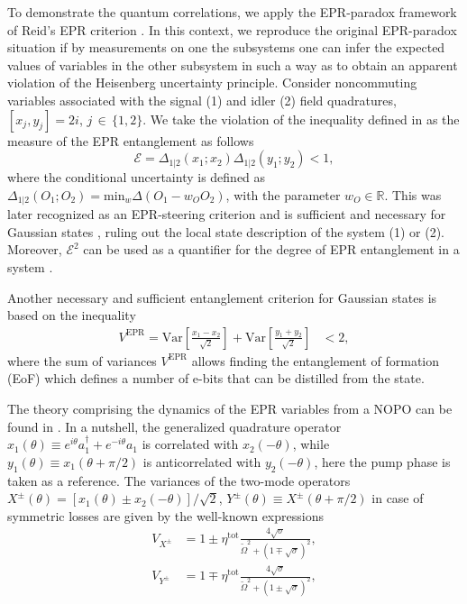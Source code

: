 \documentclass[final,twocolumn,english,prl,notitlepage,nofootinbib,floatfix,longbibliography,superscriptaddress
]{revtex4-2}
\begin{document}
To demonstrate the quantum correlations, we apply the EPR-paradox framework \cite{Einstein1935,Reid2009} of Reid's EPR criterion \cite{Reid1989}. In this context, we reproduce the original EPR-paradox situation if by measurements on one the subsystems one can infer the expected values of variables in the other subsystem in such a way as to obtain an apparent violation of the Heisenberg uncertainty principle. Consider noncommuting variables associated with the signal (1) and idler (2) field quadratures, $[x_j,y_j]=2i$, $j\,\in\, \{1,2\}$.  We take the violation of the inequality defined in \cite{Reid1989,Cavalcanti2009} as the measure of the EPR entanglement as follows
\begin{equation}
\label{eq1}
    \mathcal{E}=\Delta_{1|2}(x_1;x_2)\Delta_{1|2}(y_1;y_2) < 1,
\end{equation}
where the conditional uncertainty is defined as $\Delta_{1|2}(O_1;O_2)=\mathrm{min}_w\Delta(O_1-w_O O_2)$, with the parameter $w_O \in \mathbb{R}$. This was later recognized as an EPR-steering criterion and is sufficient and necessary for Gaussian states \cite{Cavalcanti2009}, ruling out the local state description of the system (1) or (2). Moreover, $\mathcal{E}^2$ can be used as a quantifier for the degree of EPR entanglement in a system \cite{Reid2009}.\par
Another necessary and sufficient entanglement criterion for Gaussian states is based on the inequality \cite{Simon2000,Duan2000}
\begin{align}\label{eq:EPR}
V^{\text{EPR}}=\text{Var}\left[\frac{x_1- x_2}{\sqrt{2}}\right] + \text{Var}\left[\frac{y_1 + y_2}{\sqrt{2}}\right] & < 2,
\end{align}
where the sum of variances $V^{\text{EPR}}$ allows finding the entanglement of formation (EoF) \cite{Wolf2004} which defines a number of e-bits that can be distilled from the state. \par
The theory comprising the dynamics of the EPR variables from a NOPO can be found in \cite{Drummond90,Schori2002}. In a nutshell, the generalized quadrature operator  $x_1(\theta) \equiv e^{i\theta}a_1^\dagger + e^{-i\theta}a_1$ is correlated with $x_2(-\theta)$, while $y_1(\theta)\equiv x_1(\theta+\pi/2)$ is anticorrelated with $y_2(-\theta)$, here the pump phase is taken as a reference. The variances of the two-mode operators $X^\pm(\theta) = [x_1(\theta) \pm x_2(-\theta)]/\sqrt{2}$, $Y^\pm(\theta)\equiv X^\pm(\theta+\pi/2)$  in case of symmetric losses are given by the well-known expressions \cite{Drummond90}
\begin{align}
\label{eq10}
V_{X^{\pm}} &= 1 \pm \eta^\mathrm{tot}\frac
{4\sqrt{\sigma}}{\tilde{\Omega}^{2}+(1\mp\sqrt{\sigma})^{2}},\\
V_{Y^{\pm}} &= 1 \mp \eta^\mathrm{tot}\frac
{4\sqrt{\sigma}}{\tilde{\Omega}^{2}+(1\pm\sqrt{\sigma})^{2}},
\end{align}
\end{document}
